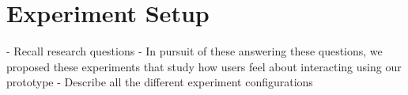 \section{Experiment Setup}

- Recall research questions
- In pursuit of these answering these questions, we proposed these experiments that study how users feel about interacting using our prototype
- Describe all the different experiment configurations
